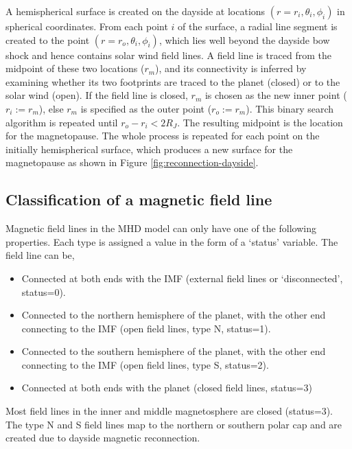 A hemispherical surface is created on the dayside at locations $(r=r_i, \theta_i, \phi_i)$ in spherical coordinates. From each point $i$ of the surface, a radial line segment is created to the point $(r=r_o, \theta_i, \phi_i)$, which lies well beyond the dayside bow shock and hence contains solar wind field lines. A field line is traced from the midpoint of these two locations ($r_m$), and its connectivity is inferred by examining whether its two footprints are traced to the planet (closed) or to the solar wind (open). If the field line is closed, $r_m$ is chosen as the new inner point ($r_i:=r_m$), else $r_m$ is specified as the outer point ($r_o:=r_m$). This binary search algorithm is repeated until $r_o - r_i < 2 R_J$. The resulting midpoint is the location for the magnetopause. The whole process is repeated for each point on the initially hemispherical surface, which produces a new surface for the magnetopause as shown in Figure \ref{fig:reconnection-dayside}. 

\subsection{Classification of a magnetic field line}
Magnetic field lines in the MHD model can only have one of the following properties. Each type is assigned a value in the form of a `status' variable. The field line can be, 

\begin{itemize}
    \item Connected at both ends with the IMF (external field lines or `disconnected', status=0).
    \item Connected to the northern hemisphere of the planet, with the other end connecting to the IMF (open field lines, type N, status=1). 
    \item Connected to the southern hemisphere of the planet, with the other end connecting to the IMF (open field lines, type S, status=2).
    \item Connected at both ends with the planet (closed field lines, status=3)
\end{itemize}

Most field lines in the inner and middle magnetosphere are closed (status=3). The type N and S field lines map to the northern or southern polar cap and are created due to dayside magnetic reconnection.

